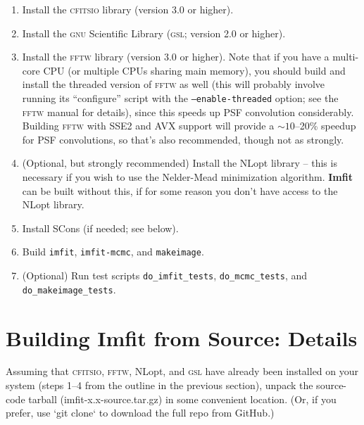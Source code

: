 \documentclass[10pt,a4paper,article]{memoir}
\newcommand{\Imfit}{\textbf{Imfit}}
\newcommand{\imfitprog}{\texttt{imfit}}
\newcommand{\imfitmcmc}{\texttt{imfit-mcmc}}
\newcommand{\makeimage}{\texttt{makeimage}}
\begin{document}
\begin{enumerate}
\item Install the \textsc{cfitsio} library (version 3.0 or higher).

\item Install the \textsc{gnu} Scientific Library (\textsc{gsl}; version 2.0 or higher).

\item Install the \textsc{fftw} library (version 3.0 or higher). Note
that if you have a multi-core CPU (or multiple CPUs sharing main
memory), you should build and install the threaded version of
\textsc{fftw} as well (this will probably involve running its
``configure'' script with the \texttt{--enable-threaded} option; see
the \textsc{fftw} manual for details), since this speeds up PSF convolution
considerably. Building \textsc{fftw} with SSE2 and AVX support will
provide a $\sim 10$--20\% speedup for PSF convolutions, so that's also
recommended, though not as strongly.

\item (Optional, but strongly recommended) Install the NLopt library --
this is necessary if you wish to use the Nelder-Mead minimization
algorithm. \Imfit{} can be built without this, if for some reason
you don't have access to the NLopt library.

\item Install SCons (if needed; see below).

\item Build \imfitprog, \imfitmcmc, and \makeimage.

\item (Optional) Run test scripts \texttt{do\_imfit\_tests}, \texttt{do\_mcmc\_tests},
and \texttt{do\_makeimage\_tests}.

\end{enumerate}



\section{Building \Imfit{} from Source: Details}\label{sec:build}

Assuming that \textsc{cfitsio}, \textsc{fftw}, NLopt, and \textsc{gsl}
have already been installed on your system (steps 1--4 from the outline
in the previous section), unpack the source-code tarball
(imfit-x.x-source.tar.gz) in some convenient location. (Or, if you
prefer, use `git clone` to download the full repo from GitHub.)
\end{document}
